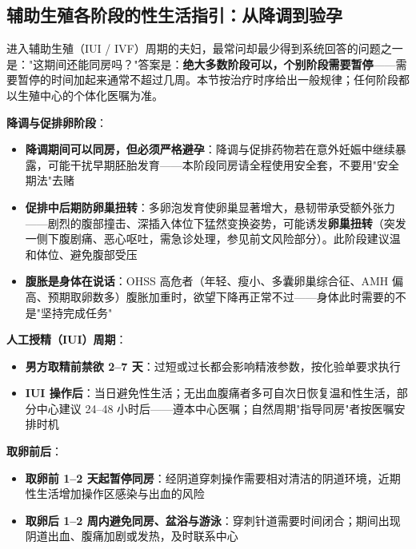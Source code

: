 \subsection{辅助生殖各阶段的性生活指引：从降调到验孕}

进入辅助生殖（IUI / IVF）周期的夫妇，最常问却最少得到系统回答的问题之一是："这期间还能同房吗？"答案是：\textbf{绝大多数阶段可以，个别阶段需要暂停}——需要暂停的时间加起来通常不超过几周。本节按治疗时序给出一般规律；任何阶段都以生殖中心的个体化医嘱为准。

\vspace{0.5em}
\noindent\textbf{降调与促排卵阶段}：

\begin{itemize}
	\item \textbf{降调期间可以同房，但必须严格避孕}：降调与促排药物若在意外妊娠中继续暴露，可能干扰早期胚胎发育——本阶段同房请全程使用安全套，不要用"安全期法"去赌
	\item \textbf{促排中后期防卵巢扭转}：多卵泡发育使卵巢显著增大，悬韧带承受额外张力——剧烈的腹部撞击、深插入体位下猛然变换姿势，可能诱发\textbf{卵巢扭转}（突发一侧下腹剧痛、恶心呕吐，需急诊处理，参见前文风险部分）。此阶段建议温和体位、避免腹部受压
	\item \textbf{腹胀是身体在说话}：OHSS 高危者（年轻、瘦小、多囊卵巢综合征、AMH 偏高、预期取卵数多）腹胀加重时，欲望下降再正常不过——身体此时需要的不是"坚持完成任务"
\end{itemize}

\vspace{0.5em}
\noindent\textbf{人工授精（IUI）周期}：

\begin{itemize}
	\item \textbf{男方取精前禁欲 2--7 天}：过短或过长都会影响精液参数，按化验单要求执行
	\item \textbf{IUI 操作后}：当日避免性生活；无出血腹痛者多可自次日恢复温和性生活，部分中心建议 24--48 小时后——遵本中心医嘱；自然周期"指导同房"者按医嘱安排时机
\end{itemize}

\vspace{0.5em}
\noindent\textbf{取卵前后}：

\begin{itemize}
	\item \textbf{取卵前 1--2 天起暂停同房}：经阴道穿刺操作需要相对清洁的阴道环境，近期性生活增加操作区感染与出血的风险
	\item \textbf{取卵后 1--2 周内避免同房、盆浴与游泳}：穿刺针道需要时间闭合；期间出现阴道出血、腹痛加剧或发热，及时联系中心
\end{itemize}

